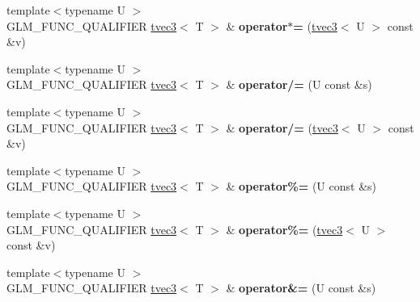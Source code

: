 \begin{DoxyCompactItemize}
\item 
\hypertarget{structglm_1_1detail_1_1tvec3_a6e67f23dc13d11ef371d48258fe22fd5}{{\footnotesize template$<$typename U $>$ }\\G\-L\-M\-\_\-\-F\-U\-N\-C\-\_\-\-Q\-U\-A\-L\-I\-F\-I\-E\-R \hyperlink{structglm_1_1detail_1_1tvec3}{tvec3}$<$ T $>$ \& {\bfseries operator$\ast$=} (\hyperlink{structglm_1_1detail_1_1tvec3}{tvec3}$<$ U $>$ const \&v)}\label{structglm_1_1detail_1_1tvec3_a6e67f23dc13d11ef371d48258fe22fd5}

\item 
\hypertarget{structglm_1_1detail_1_1tvec3_aaf43e2e7550db50a73daac9f19ab3da0}{{\footnotesize template$<$typename U $>$ }\\G\-L\-M\-\_\-\-F\-U\-N\-C\-\_\-\-Q\-U\-A\-L\-I\-F\-I\-E\-R \hyperlink{structglm_1_1detail_1_1tvec3}{tvec3}$<$ T $>$ \& {\bfseries operator/=} (U const \&s)}\label{structglm_1_1detail_1_1tvec3_aaf43e2e7550db50a73daac9f19ab3da0}

\item 
\hypertarget{structglm_1_1detail_1_1tvec3_accea3bc20f85349592f24c745e92af4e}{{\footnotesize template$<$typename U $>$ }\\G\-L\-M\-\_\-\-F\-U\-N\-C\-\_\-\-Q\-U\-A\-L\-I\-F\-I\-E\-R \hyperlink{structglm_1_1detail_1_1tvec3}{tvec3}$<$ T $>$ \& {\bfseries operator/=} (\hyperlink{structglm_1_1detail_1_1tvec3}{tvec3}$<$ U $>$ const \&v)}\label{structglm_1_1detail_1_1tvec3_accea3bc20f85349592f24c745e92af4e}

\item 
\hypertarget{structglm_1_1detail_1_1tvec3_a3e04059f4cf2bb09d913c72f7f16999d}{{\footnotesize template$<$typename U $>$ }\\G\-L\-M\-\_\-\-F\-U\-N\-C\-\_\-\-Q\-U\-A\-L\-I\-F\-I\-E\-R \hyperlink{structglm_1_1detail_1_1tvec3}{tvec3}$<$ T $>$ \& {\bfseries operator\%=} (U const \&s)}\label{structglm_1_1detail_1_1tvec3_a3e04059f4cf2bb09d913c72f7f16999d}

\item 
\hypertarget{structglm_1_1detail_1_1tvec3_a9ee07143166b23d7f418c5f52b5f02ae}{{\footnotesize template$<$typename U $>$ }\\G\-L\-M\-\_\-\-F\-U\-N\-C\-\_\-\-Q\-U\-A\-L\-I\-F\-I\-E\-R \hyperlink{structglm_1_1detail_1_1tvec3}{tvec3}$<$ T $>$ \& {\bfseries operator\%=} (\hyperlink{structglm_1_1detail_1_1tvec3}{tvec3}$<$ U $>$ const \&v)}\label{structglm_1_1detail_1_1tvec3_a9ee07143166b23d7f418c5f52b5f02ae}

\item 
\hypertarget{structglm_1_1detail_1_1tvec3_a935bec1a7a9d68544b77d0027605298c}{{\footnotesize template$<$typename U $>$ }\\G\-L\-M\-\_\-\-F\-U\-N\-C\-\_\-\-Q\-U\-A\-L\-I\-F\-I\-E\-R \hyperlink{structglm_1_1detail_1_1tvec3}{tvec3}$<$ T $>$ \& {\bfseries operator\&=} (U const \&s)}\label{structglm_1_1detail_1_1tvec3_a935bec1a7a9d68544b77d0027605298c}


\end{DoxyCompactItemize}
